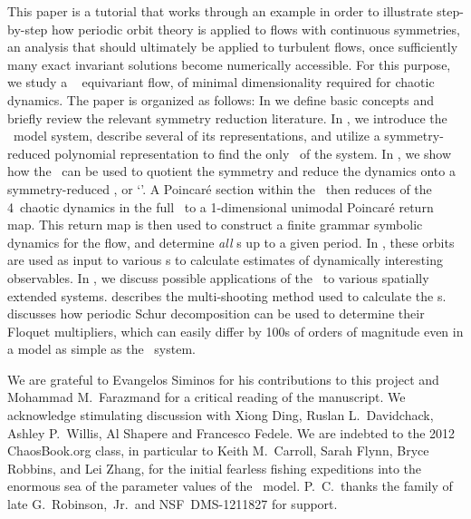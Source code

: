 \documentclass[aip,cha,
reprint,
secnumarabic,
nofootinbib, tightenlines,
nobibnotes, showkeys, showpacs,
superscriptaddress,
]{revtex4-1}
\begin{document}
This paper is a tutorial that works through an example in order to
illustrate step-by-step how periodic orbit theory is applied to flows
with continuous symmetries, an analysis that should ultimately be applied
to turbulent flows, once sufficiently many exact invariant solutions
become numerically accessible. For this purpose, we study a \twomode\
 equivariant flow, of minimal dimensionality required for chaotic
dynamics. The paper is organized as follows: In \refsect{s:symm} we
define basic concepts and briefly review the relevant symmetry reduction
literature. In \refsect{s:twoMode}, we introduce the \twomode\ model
system, describe several of its representations, and utilize a
symmetry-reduced polynomial representation to find the only \reqv\ of the
system. In \refsect{s:numerics}, we show how the \mslices\ can be used to
quotient the symmetry and reduce the dynamics onto a symmetry-reduced
\statesp, or `\slice'. A Poincar\'e section within the \slice\ then
reduces of the 4\dmn\ chaotic dynamics in the full \statesp\ to a
1-dimensional unimodal Poincar\'e return map. This return map is then
used to construct a finite grammar symbolic dynamics for the flow, and
determine {\em all} \rpo s up to a given period. In ,
these orbits are used as input to various {\cycForm s} to calculate
estimates of dynamically interesting observables. In ,
we discuss possible applications of the \mslices\ to various spatially
extended systems.
 describes the multi-shooting method used to calculate
the \rpo s.
 discusses how periodic Schur decomposition can be used
to determine their Floquet multipliers, which can easily differ by 100s
of orders of magnitude even in a model as simple as the \twomode\ system.










\begin{acknowledgments}
We are grateful to Evangelos Siminos for his contributions to this project
and Mohammad M.~Farazmand for a critical reading of the manuscript.
We acknowledge stimulating discussion with
Xiong Ding,
Ruslan L.~Davidchack,
Ashley P.~Willis,
Al Shapere
and
Francesco Fedele.
We are indebted to the 2012 ChaosBook.org class, in particular to
Keith M.~Carroll,
Sarah Flynn,
Bryce Robbins,
and
Lei Zhang,
for the initial fearless fishing expeditions into the enormous sea of the
parameter values of the \twomode\ model.
P.~C.\ thanks the family of late G.~Robinson,~Jr.\
and
NSF~DMS-1211827 for support.
\end{acknowledgments}
\end{document}
